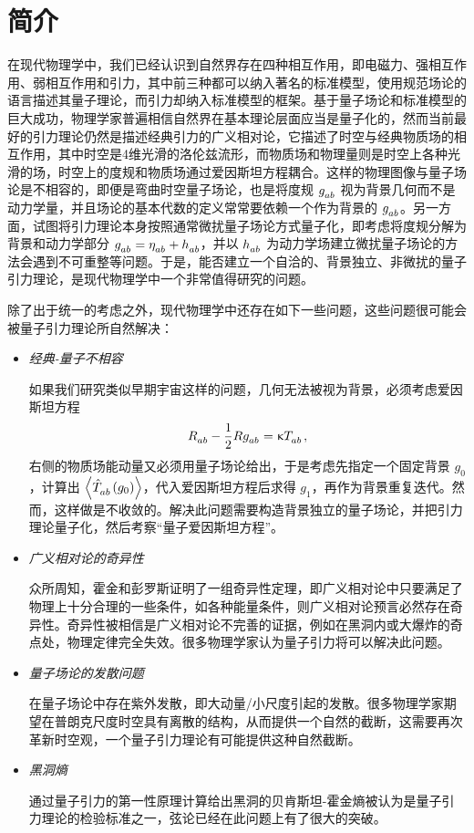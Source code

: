 
\chapter{简介}

	在现代物理学中，我们已经认识到自然界存在四种相互作用，即电磁力、强相互作用、弱相互作用和引力，其中前三种都可以纳入著名的标准模型，使用规范场论的语言描述其量子理论，而引力却纳入标准模型的框架。基于量子场论和标准模型的巨大成功，物理学家普遍相信自然界在基本理论层面应当是量子化的，然而当前最好的引力理论仍然是描述经典引力的广义相对论，它描述了时空与经典物质场的相互作用，其中时空是4维光滑的洛伦兹流形，而物质场和物理量则是时空上各种光滑的场，时空上的度规和物质场通过爱因斯坦方程耦合。这样的物理图像与量子场论是不相容的，即便是弯曲时空量子场论，也是将度规 $\tensor{g}{_a_b}$ 视为背景几何而不是动力学量，并且场论的基本代数的定义常常要依赖一个作为背景的 $\tensor{g}{_a_b}$。另一方面，试图将引力理论本身按照通常微扰量子场论方式量子化，即考虑将度规分解为背景和动力学部分 $\tensor{g}{_a_b} = \tensor{\eta}{_a_b} + \tensor{h}{_a_b}$，并以 $\tensor{h}{_a_b}$ 为动力学场建立微扰量子场论的方法会遇到不可重整等问题。于是，能否建立一个自洽的、背景独立、非微扰的量子引力理论，是现代物理学中一个非常值得研究的问题。

	除了出于统一的考虑之外，现代物理学中还存在如下一些问题，这些问题很可能会被量子引力理论所自然解决：
	\begin{itemize}
		\item \emph{经典-量子不相容}
		
			如果我们研究类似早期宇宙这样的问题，几何无法被视为背景，必须考虑爱因斯坦方程
			\begin{equation}
				\tensor{R}{_a_b} - \frac{1}{2} R \tensor{g}{_a_b} = \gkappa \tensor{T}{_a_b},
			\end{equation}
			右侧的物质场能动量又必须用量子场论给出，于是考虑先指定一个固定背景 $g_0$，计算出 $\left\langle \tensor{\hat{T}}{_a_b}(g_0) \right\rangle$，代入爱因斯坦方程后求得 $g_1$，再作为背景重复迭代。然而，这样做是不收敛的\cite{Flanagan:1996gw}。解决此问题需要构造背景独立的量子场论，并把引力理论量子化，然后考察“量子爱因斯坦方程”。

		\item \emph{广义相对论的奇异性}
		
			众所周知，霍金和彭罗斯证明了一组奇异性定理，即广义相对论中只要满足了物理上十分合理的一些条件，如各种能量条件，则广义相对论预言必然存在奇异性\cite{Hawking1973,wald1989}。奇异性被相信是广义相对论不完善的证据，例如在黑洞内或大爆炸的奇点处，物理定律完全失效。很多物理学家认为量子引力将可以解决此问题。

		\item \emph{量子场论的发散问题}
		
			在量子场论中存在紫外发散，即大动量/小尺度引起的发散。很多物理学家期望在普朗克尺度时空具有离散的结构，从而提供一个自然的截断，这需要再次革新时空观，一个量子引力理论有可能提供这种自然截断。

		\item \emph{黑洞熵}
		
			通过量子引力的第一性原理计算给出黑洞的贝肯斯坦-霍金熵被认为是量子引力理论的检验标准之一，弦论已经在此问题上有了很大的突破。
	\end{itemize}

